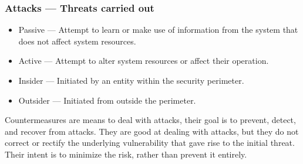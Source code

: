 \subsubsection{Attacks --- Threats carried out}

\begin{itemize}
	\item Passive --- Attempt to learn or make use of information from the system that does not affect system resources.
	\item Active --- Attempt to alter system resources or affect their operation.
	\item Insider --- Initiated by an entity within the security perimeter.
	\item Outsider --- Initiated from outside the perimeter.
\end{itemize}

Countermeasures are means to deal with attacks, their goal is to prevent, detect, and recover from attacks. They are good at dealing with attacks, but they do not correct 
or rectify the underlying vulnerability that gave rise to the initial threat. Their intent is to minimize the risk, rather than prevent it entirely.
